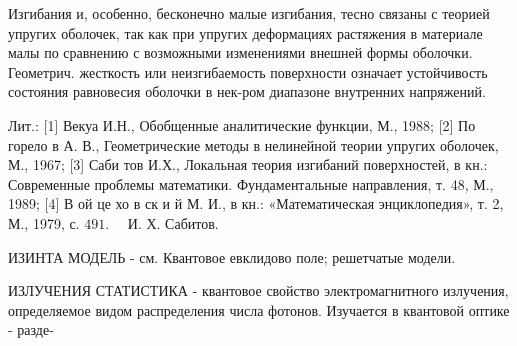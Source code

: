 \documentclass[10pt]{article}
\begin{document}
Изгибания и, особенно, бесконечно малые изгибания, тесно связаны с теорией упругих оболочек, так как при упругих деформациях растяжения в материале малы по сравнению с возможными изменениями внешней формы оболочки. Геометрич. жесткость или неизгибаемость поверхности означает устойчивость состояния равновесия оболочки в нек-ром диапазоне внутренних напряжений.



Лит.: [1] Векуа И.Н., Обобщенные аналитические функции, М., 1988; [2] По горело в А. В., Геометрические методы в нелинейной теории упругих оболочек, М., 1967; [3] Саби тов И.Х., Локальная теория изгибаний поверхностей, в кн.: Современные проблемы математики. Фундаментальные направления, т. 48, М., 1989; [4] В ой це хо в ск и й М. И., в кн.: «Математическая энциклопедия», т. 2, М., 1979, с. $491 . \quad$ И. Х. Сабитов.



ИЗИНТА МОДЕЛЬ - см. Квантовое евклидово поле; решетчатые модели.



ИЗЛУЧЕНИЯ СТАТИСТИКА - квантовое свойство электромагнитного излучения, определяемое видом распределения числа фотонов. Изучается в квантовой оптике - разде-
\end{document}
